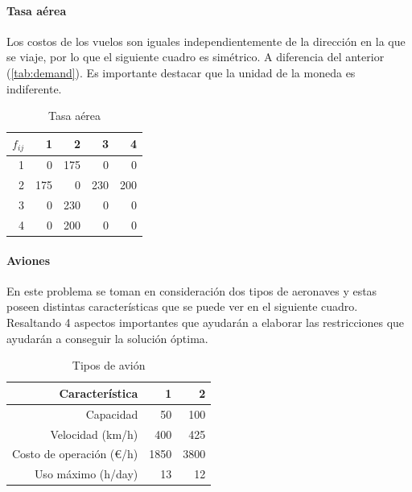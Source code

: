 \documentclass[12pt]{article}
\begin{document}
\paragraph{Tasa aérea}

Los costos de los vuelos son iguales independientemente de la dirección en la que se viaje, por lo que el siguiente cuadro es simétrico. A diferencia del anterior (\ref{tab:demand}). Es importante destacar que la unidad de la moneda es indiferente.

\begin{table}[h!]
    \centering
    \begin{tabular}{r|r|r|r|r}
        $f_{ij}$%
               &   1  &   2  &   3  &   4\\
            \hline
            \hline
            1  &   0  & 175  &   0  &   0\\
            2  & 175  &   0  & 230  & 200\\
            3  &   0  & 230  &   0  &   0\\
            4  &   0  & 200  &   0  &   0\\
    \end{tabular}
    \caption{Tasa aérea}
    \label{tab:fare}
\end{table}

\paragraph{Aviones}

En este problema se toman en consideración dos tipos de aeronaves y estas poseen distintas características que se puede ver en el siguiente cuadro. Resaltando 4 aspectos importantes que ayudarán a elaborar las restricciones que ayudarán a conseguir la solución óptima.

\begin{table}[h!]
    \centering
    \begin{tabular}{r|r|r}
        Característica               &    1 &    2\\
        \hline
        \hline
        Capacidad                    &   50 &  100\\
        Velocidad (km/h)             &  400 &  425\\
        Costo de operación (\euro/h) & 1850 & 3800\\
        Uso máximo (h/day)           &   13 &   12\\
    \end{tabular}
    \caption{Tipos de avión}
    \label{tab:planes}
\end{table}
\end{document}
